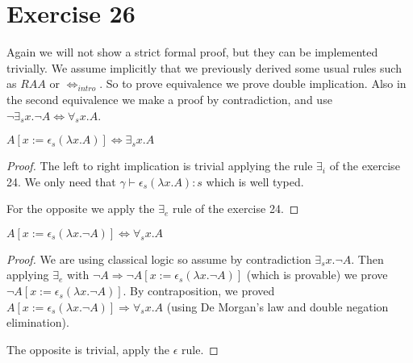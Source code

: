 \section{Exercise 26}

Again we will not show a strict formal proof, but they can be implemented
trivially. We assume implicitly that we previously derived some usual rules
such as $RAA$ or $\iff_{intro}$. So to prove equivalence we prove
double implication. Also in the second equivalence we make a proof
by contradiction, and use $\neg \exists_s x. \neg A \iff \forall_s x . A $.

\begin{theorem}
  $A[x:=\epsilon_s (\lambda x. A)] \Leftrightarrow \exists_s x . A$
\end{theorem}
\begin{proof}

  The left to right implication is trivial applying the rule $\exists_i$
  of the exercise 24. We only need that
  $\gamma \vdash \epsilon_s (\lambda x. A) : s$ which is well typed.

  For the opposite we apply the $\exists_e$ rule of the exercise 24.

\end{proof}


\begin{theorem}
  $A[x:=\epsilon_s (\lambda x. \neg A)] \Leftrightarrow \forall_s x . A$
\end{theorem}
\begin{proof}
  We are using classical logic so assume by contradiction
  $\exists_s x . \neg A$. Then applying $\exists_e$ with
  $\neg A \Rightarrow \neg A [x:=\epsilon_s (\lambda x. \neg A)]$
  (which is provable) we prove $\neg A [x:=\epsilon_s (\lambda x. \neg A)]$.
  By contraposition, we proved
  $A[x:=\epsilon_s (\lambda x. \neg A)] \Rightarrow \forall_s x . A$ (using
  De Morgan's law and double negation elimination).

  The opposite is trivial, apply the $\epsilon$ rule.
\end{proof}

